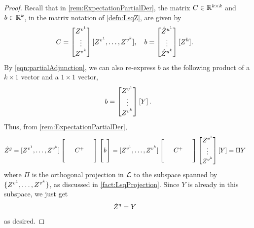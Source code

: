 \documentclass[main.tex]{subfiles}
\begin{document}
\begin{proof}
  Recall that in \cref{rem:ExpectationPartialDer}, the matrix $C\in \mathbb{R}^{k \times k}$ and $b \in \mathbb{R}^k$, in the matrix notation of \cref{defn:LsqZ}, are given by
  \begin{align*}
  C
    &=
      \begin{bmatrix}
      Z^{v^1}\\
      \vdots\\
      Z^{v^k}
      \end{bmatrix}
      [Z^{v^1}, \ldots,  Z^{v^{k}}]
      ,\quad
  b
    =
      \begin{bmatrix}
      \hat Z^{u^1}\\
      \vdots\\
      \hat Z^{u^k}
      \end{bmatrix}
      [Z^{h}]
      .
  \end{align*}
  By \cref{eqn:partialAdjunction}, we can also re-express $b$ as the following product of a $k \times 1$ vector and a $1 \times 1$ vector,
  \begin{equation*}
  b
    =
      \begin{bmatrix}
      Z^{v^1}\\
      \vdots\\
      Z^{v^k}
      \end{bmatrix}
      \left[ Y
      \right]
      .
  \end{equation*}
  Thus, from \cref{rem:ExpectationPartialDer},
  \begin{align*}
  \Zdot^{g}
    &=
      [Z^{\vv^1}, \ldots,  Z^{\vv^k}]
      \sqmat{C^+}
      \colmat{b}
    =
      [Z^{\vv^1}, \ldots,  Z^{\vv^k}]
      \sqmat{C^+}
      \begin{bmatrix}
      Z^{\vv^1}\\
      \vdots\\
      Z^{\vv^k}
      \end{bmatrix}
      [Y]
    =
      \Pi Y
  \end{align*}
  where $\Pi$ is the orthogonal projection in $\mathcal{L}$ to the subspace spanned by $\{ Z^{v^1}, \ldots,  Z^{v^k}\}$, as discussed in \cref{fact:LsqProjection}.
  Since $Y$ is already in this subspace, we just get
  \begin{align*}
  \dot Z^{g}
    &=
      Y
  \end{align*}
  as desired.


\end{proof}
\end{document}
